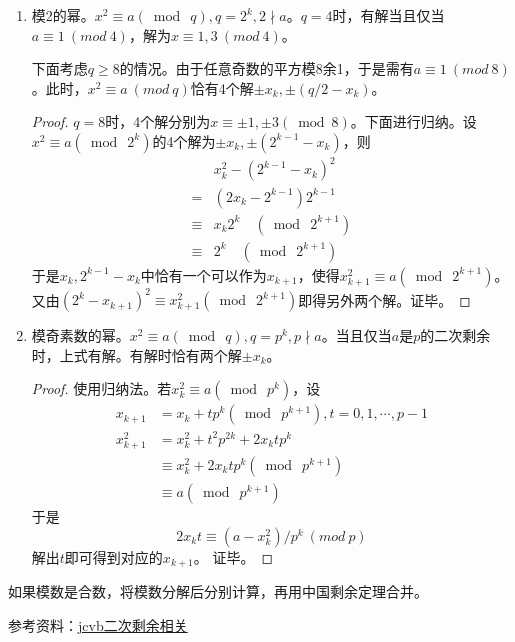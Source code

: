 \begin{enumerate}
\item {\heiti 模2的幂。}$x^{2} \equiv a(\bmod\ q), q=2^{k}, 2\nmid a$。$q=4$时，有解当且仅当$a\equiv 1\ (mod\ 4)$，解为$x\equiv 1,3\ (mod\ 4)$。

下面考虑$q\ge8$的情况。由于任意奇数的平方模$8$余1，于是需有$a\equiv 1\ (mod\ 8)$。此时，$x^2\equiv a\ (mod\ q)$恰有4个解$\pm x_{k}, \pm\left(q / 2-x_{k}\right)$。
\begin{proof}
$q=8$时，4个解分别为$x \equiv \pm 1, \pm 3(\bmod 8)$。下面进行归纳。设$x^{2} \equiv a\left(\bmod\ 2^{k}\right)$的4个解为$\pm x_{k}, \pm\left(2^{k-1}-x_{k}\right)$，则
$$
\begin{aligned} & x_{k}^{2}-\left(2^{k-1}-x_{k}\right)^{2} \\=&\left(2 x_{k}-2^{k-1}\right) 2^{k-1} \\ \equiv & x_{k} 2^{k} \quad\left(\bmod\ 2^{k+1}\right) \\ \equiv & 2^{k} \quad\left(\bmod\ 2^{k+1}\right) \end{aligned}
$$
于是$x_{k}, 2^{k-1}-x_{k}$中恰有一个可以作为$x_{k+1}$，使得$x_{k+1}^{2} \equiv a\left(\bmod\ 2^{k+1}\right)$。又由$\left(2^{k}-x_{k+1}\right)^{2} \equiv x_{k+1}^{2}\left(\bmod\ 2^{k+1}\right)$即得另外两个解。证毕。
\end{proof}

\item {\heiti 模奇素数的幂。}$x^{2} \equiv a(\bmod\ q), q=p^{k}, p \nmid a$。当且仅当$a$是$p$的二次剩余时，上式有解。有解时恰有两个解$\pm x_{k}$。
\begin{proof}
使用归纳法。若$x_{k}^{2} \equiv a\left(\bmod\ p^{k}\right)$，设
$$
\begin{aligned} x_{k+1} &=x_{k}+t p^{k}\left(\bmod\ p^{k+1}\right), t=0,1, \cdots, p-1 \\ x_{k+1}^{2} &=x_{k}^{2}+t^{2} p^{2 k}+2 x_{k} t p^{k} \\ & \equiv x_{k}^{2}+2 x_{k} t p^{k}\left(\bmod\ p^{k+1}\right) \\ & \equiv a\left(\bmod\ p^{k+1}\right) \end{aligned}
$$
于是
$$
2x_kt\equiv (a-x_k^2)/p^k\ (mod\ p)
$$
解出$t$即可得到对应的$x_{k+1}$。
证毕。
\end{proof}
\end{enumerate}

\vbox{}

{\heiti 如果模数是合数，将模数分解后分别计算，再用中国剩余定理合并。}

参考资料：\href{https://max.book118.com/html/2018/0525/168640677.shtm}{jcvb\quad 二次剩余相关}

